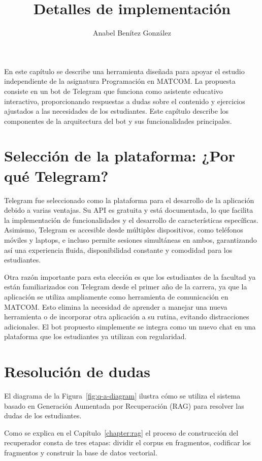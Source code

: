 \documentclass{article}
\title{Detalles de implementación}
\author{Anabel Benítez González}
\date{}
\begin{document}
\maketitle

En este capítulo se describe una herramienta diseñada para apoyar el estudio independiente de  la asignatura Programación en \mbox{MATCOM}. La propuesta consiste en un bot de Telegram que funciona como asistente educativo interactivo, proporcionando respuestas a dudas sobre el contenido y ejercicios ajustados a las necesidades de los estudiantes. Este capítulo describe los componentes de la arquitectura del bot y sus funcionalidades principales.

\section{Selección de la plataforma: ¿Por qué Telegram?}

Telegram fue seleccionado como la plataforma para el desarrollo de la aplicación debido a varias ventajas. Su API es gratuita y está documentada, lo que facilita la implementación de funcionalidades y el desarrollo de características específicas. Asimismo, Telegram es accesible desde múltiples dispositivos, como teléfonos móviles y laptops, e incluso permite sesiones simultáneas en ambos, garantizando así una experiencia fluida, disponibilidad constante y comodidad para los estudiantes.

Otra razón importante para esta elección es que los estudiantes de la facultad ya están familiarizados con Telegram desde el primer año de la carrera, ya que la aplicación se utiliza ampliamente como herramienta de comunicación en \mbox{MATCOM}. Esto elimina la necesidad de aprender a manejar una nueva herramienta o de incorporar otra aplicación a su rutina, evitando distracciones adicionales. El bot propuesto simplemente se integra como un nuevo chat en una plataforma que los estudiantes ya utilizan con regularidad.

\section{Resolución de dudas}

El diagrama de la Figura~\ref{fig:q-a-diagram} ilustra cómo se utiliza el sistema basado en Generación Aumentada por Recuperación (RAG) para resolver las dudas de los estudiantes.

Como se explica en el Capítulo~\ref{chapter:rag} el proceso de construcción del recuperador consta de tres etapas: dividir el corpus en fragmentos, codificar los fragmentos y construir la base de datos vectorial.
\end{document}
